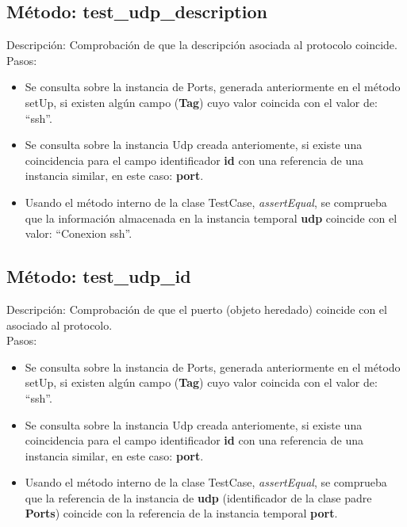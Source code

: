 

\subsection{\quad Método: test\_udp\_description}

Descripción: Comprobación de que la descripción asociada al protocolo coincide.\\
Pasos:
\begin{itemize}
\item Se consulta sobre la instancia de Ports, generada anteriormente en el método setUp, si existen algún campo (\textbf{Tag}) cuyo valor coincida con el valor de: ``ssh''.
\item Se consulta sobre la instancia Udp creada anteriomente, si existe una coincidencia para el campo identificador \textbf{id} con una referencia de una instancia similar, en este caso: \textbf{port}.
\item Usando el método interno de la clase TestCase, \emph{assertEqual}, se comprueba que la información almacenada en la instancia temporal \textbf{udp} coincide con el valor: ``Conexion ssh''.
\end{itemize}



\subsection{\quad Método: test\_udp\_id}

Descripción: Comprobación de que el puerto (objeto heredado) coincide con el asociado al protocolo.\\
Pasos:
\begin{itemize}
\item Se consulta sobre la instancia de Ports, generada anteriormente en el método setUp, si existen algún campo (\textbf{Tag}) cuyo valor coincida con el valor de: ``ssh''.
\item Se consulta sobre la instancia Udp creada anteriomente, si existe una coincidencia para el campo identificador \textbf{id} con una referencia de una instancia similar, en este caso: \textbf{port}.
\item Usando el método interno de la clase TestCase, \emph{assertEqual}, se comprueba que la referencia de la instancia de \textbf{udp} (identificador de la clase padre \textbf{Ports}) coincide con la referencia de la instancia temporal \textbf{port}.
\end{itemize}

